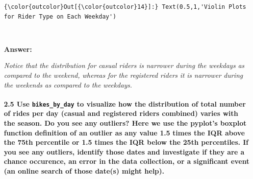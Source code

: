 \documentclass[11pt]{article}
\begin{document}
\begin{Verbatim}[commandchars=\\\{\}]
{\color{outcolor}Out[{\color{outcolor}14}]:} Text(0.5,1,'Violin Plots for Rider Type on Each Weekday')
\end{Verbatim}
            
    \begin{center}
    \end{center}
    { \hspace*{\fill} \\}
    
    \textbf{Answer:}

\emph{Notice that the distribution for casual riders is narrower during
the weekdays as compared to the weekend, whereas for the registered
riders it is narrower during the weekends as compared to the weekdays.}

    \paragraph{\texorpdfstring{\textbf{2.5} Use \texttt{bikes\_by\_day} to
visualize how the distribution of \textbf{total number of rides} per day
(casual and registered riders combined) varies with the \textbf{season}.
Do you see any \textbf{outliers}? Here we use the pyplot's boxplot
function definition of an outlier as any value 1.5 times the IQR above
the 75th percentile or 1.5 times the IQR below the 25th percentiles. If
you see any outliers, identify those dates and investigate if they are a
chance occurence, an error in the data collection, or a significant
event (an online search of those date(s) might
help).}{2.5 Use bikes\_by\_day to visualize how the distribution of total number of rides per day (casual and registered riders combined) varies with the season. Do you see any outliers? Here we use the pyplot's boxplot function definition of an outlier as any value 1.5 times the IQR above the 75th percentile or 1.5 times the IQR below the 25th percentiles. If you see any outliers, identify those dates and investigate if they are a chance occurence, an error in the data collection, or a significant event (an online search of those date(s) might help).}}\label{use-bikes_by_day-to-visualize-how-the-distribution-of-total-number-of-rides-per-day-casual-and-registered-riders-combined-varies-with-the-season.-do-you-see-any-outliers-here-we-use-the-pyplots-boxplot-function-definition-of-an-outlier-as-any-value-1.5-times-the-iqr-above-the-75th-percentile-or-1.5-times-the-iqr-below-the-25th-percentiles.-if-you-see-any-outliers-identify-those-dates-and-investigate-if-they-are-a-chance-occurence-an-error-in-the-data-collection-or-a-significant-event-an-online-search-of-those-dates-might-help.}
\end{document}
